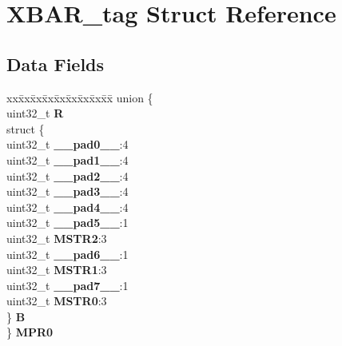 \hypertarget{structXBAR__tag}{}\section{X\+B\+A\+R\+\_\+tag Struct Reference}
\label{structXBAR__tag}
\subsection*{Data Fields}
\begin{DoxyCompactItemize}
\item 
\mbox{\label{structXBAR__tag_a439b5fdbf692a532318ad50023477c50}} 
\begin{tabbing}
xx\=xx\=xx\=xx\=xx\=xx\=xx\=xx\=xx\=\kill
union \{\\
\>uint32\_t {\bfseries R}\\
\>struct \{\\
\>\>uint32\_t {\bfseries \_\_pad0\_\_}:4\\
\>\>uint32\_t {\bfseries \_\_pad1\_\_}:4\\
\>\>uint32\_t {\bfseries \_\_pad2\_\_}:4\\
\>\>uint32\_t {\bfseries \_\_pad3\_\_}:4\\
\>\>uint32\_t {\bfseries \_\_pad4\_\_}:4\\
\>\>uint32\_t {\bfseries \_\_pad5\_\_}:1\\
\>\>uint32\_t {\bfseries MSTR2}:3\\
\>\>uint32\_t {\bfseries \_\_pad6\_\_}:1\\
\>\>uint32\_t {\bfseries MSTR1}:3\\
\>\>uint32\_t {\bfseries \_\_pad7\_\_}:1\\
\>\>uint32\_t {\bfseries MSTR0}:3\\
\>\} {\bfseries B}\\
\} {\bfseries MPR0}\\


\end{tabbing}
\end{DoxyCompactItemize}
